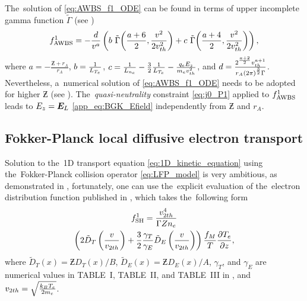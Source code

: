 The~solution of \eqref{eq:AWBS_f1_ODE} can be found in terms of 
upper incomplete gamma function $\tilde{\Gamma}$ 
(see )
\begin{equation}
  f^1_{\text{AWBS}} = - \frac{d}{v^a} 
  \left(b~\tilde{\Gamma}{\left(\frac{a+6}{2}, \frac{v^2}{2v_{th}^2}\right)}
  + c~\tilde{\Gamma}{\left(\frac{a+4}{2}, \frac{v^2}{2v_{th}^2}\right)}\right)
  ,
  \label{eq:AWBS_analytic_solution}
\end{equation}
where 
$a = -\frac{\Zbar + r_A}{r_A}$, $b = \frac{1}{L_{T_e}}$, 
$c = \frac{1}{L_{n_e}} - \frac{3}{2}\frac{1}{L_{T_e}} 
- \frac{q_eE_z}{m_ev_{th}^2}$, and
$d = \frac{2^{\frac{a + 2}{2}} v_{th}^{a + 1}}{r_A (2\pi)^{\frac{3}{2}} \Gamma}$.
Nevertheless, a~numerical solution of \eqref{eq:AWBS_f1_ODE} needs to be 
adopted for higher $\Zbar$  (see ).
The~\textit{quasi-neutrality} constraint \eqref{eq:j0_P1} applied to
$f^1_{\text{AWBS}}$ leads to $E_z = \boldsymbol{E}_L$ \eqref{app_eq:BGK_Efield} 
independently from $\Zbar$ and $r_A$. 


\subsection{Fokker-Planck local diffusive electron transport}
\label{sec:FPDiffusiveRegime}

Solution to the~1D transport equation \eqref{eq:1D_kinetic_equation}
using the~Fokker-Planck collision operator \eqref{eq:LFP_model}
is very ambitious, as demonstrated in 
\cite{Chandrasekhar_RMP1943, CSR_1950, Rosenbluth_PR1957}, fortunately, one 
can use the~explicit evaluation of the~electron distribution function
published in \cite{SpitzerHarm_PR1953}, which takes the~following form
\begin{multline}
  \ft^1_{\text{SH}} = %
  \frac{\vtwoh^4}{\Gamma\Zbar n_e}\\
  \left( 2\tilde{D}_T\left(\frac{\vmag}{\vtwoh}\right) 
  + \frac{3}{2}\frac{\gamma_T}{\gamma_E} 
  \tilde{D}_E\left(\frac{\vmag}{\vtwoh}\right) \right)%
  \frac{\fM}{T}\pdv{T_e}{z}  ,
  \label{eq:f1_SH}
\end{multline}
where $\tilde{D}_T(x) = \Zbar D_{T}(x) / B$, 
$\tilde{D}_E(x) = \Zbar D_{E}(x) / A$, $\gamma_T$,
and $\gamma_E$ are numerical values in TABLE~I, TABLE~II, and
TABLE~III in \cite{SpitzerHarm_PR1953}, and 
$v_{2 th} = \sqrt{\frac{k_B T_e}{2m_e}}$.

